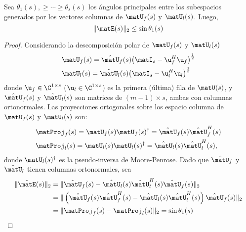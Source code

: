
\begin{theorem}\label{The1:ESTER_GAP}
	Sea $\theta_1(s),\ge\cdots\ge\theta_s(s)$ los ángulos principales entre los subespacios generados por los vectores columnas de $\matU_f(s)$ y $\matU_l(s)$. Luego,
	\begin{equation}
		\|\matE(s)\|_2  \le \sin\theta_1(s)
		\label{Eq:ESTERBound}
	\end{equation}
\end{theorem}  
\begin{proof} Considerando la descomposición polar de $\matU_f(s)$ y $\matU_l(s)$
	\begin{equation}
		\begin{aligned}
			& \matU_f(s) = \hat{\matU}_f(s)\big(\matI_s -         \u_f^H\u_f\big)^{\frac{1}{2}}\\
			& \matU_l(s) = \hat{\matU}_l(s)\big(\matI_s -         \u_l^H\u_l\big)^{\frac{1}{2}}
		\end{aligned}
		\label{Eq:nearest_Orthonormal}
	\end{equation}
	donde $\u_f\in\C^{1\times s}$ ($\u_l\in\C^{1\times s}$) es la primera (última) fila de $\matU(s)$, y $\hat{\matU}_f(s)$ y $\hat{\matU}_l(s) $ son matrices de $(m-1)\times s$, ambas con columnas ortonormales. Las proyecciones ortogonales sobre los espacio columna de  $\matU_f(s)$ y $\matU_l(s)$ son:  
	\begin{equation}
		\begin{aligned}
			& \matProj_f(s) = \matU_f(s)\matU_f(s)^\dagger = \hat{\matU}_{f}(s)\hat{\matU}_{f}^H(s) \\
			& \matProj_l(s) = \matU_l(s)\matU_l(s)^\dagger = \hat{\matU}_{l}(s)\hat{\matU}_{l}^H(s),
		\end{aligned}
		\label{Eq:ProjMatrix}
	\end{equation}
	donde $\matU_l(s)^\dagger$ es la pseudo-inversa de Moore-Penrose. 
	Dado que $\hat{\matU}_f$ y $\hat{\matU}_l$ tienen columnas ortonormales, sea
	\[\begin{aligned} \|\hat{\matE}(s)\|_2 & = \|\hat{\matU}_{f}(s) -\hat{\matU}_{l}(s)\hat{\matU}_l^H(s)\hat{\matU}_f(s)\|_2 \\\ & = \|\left(\hat{\matU}_{f}(s)\hat{\matU}_{f}^H(s) -\hat{\matU}_{l}(s)\hat{\matU}_l^H(s)\right)\hat{\matU}_f(s)\|_2\\
		&  = \|\matProj_f(s) - \matProj_l(s)\|_2 = \sin \theta_1(s)
	\end{aligned}
\]
\end{proof}
